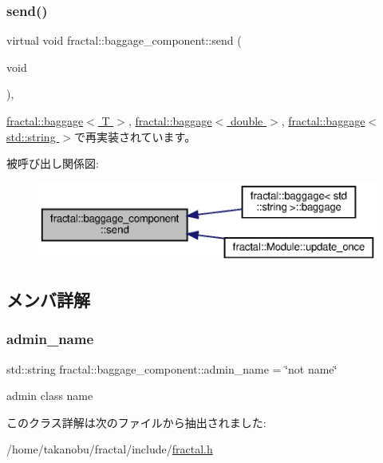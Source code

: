 \subsubsection{\texorpdfstring{send()}{send()}}
{\footnotesize\ttfamily virtual void fractal\+::baggage\+\_\+component\+::send (\begin{DoxyParamCaption}\item[{void}]{ }\end{DoxyParamCaption})\hspace{0.3cm}{\ttfamily [inline]}, {\ttfamily [virtual]}}



\hyperlink{classfractal_1_1baggage_a12ef96c1b906369cfeeabdead61c257b}{fractal\+::baggage$<$ T $>$}, \hyperlink{classfractal_1_1baggage_a12ef96c1b906369cfeeabdead61c257b}{fractal\+::baggage$<$ double $>$}, \hyperlink{classfractal_1_1baggage_a12ef96c1b906369cfeeabdead61c257b}{fractal\+::baggage$<$ std\+::string $>$}で再実装されています。

被呼び出し関係図\+:
\nopagebreak
\begin{figure}[H]
\begin{center}
\leavevmode
\includegraphics[width=350pt]{classfractal_1_1baggage__component_a8fdf9e534f892911e674de5a60eadf64_icgraph}
\end{center}
\end{figure}


\subsection{メンバ詳解}
\mbox{\label{classfractal_1_1baggage__component_a629dba0fbfbce31e2caeb075440ee2dc}} 
\subsubsection{\texorpdfstring{admin\+\_\+name}{admin\_name}}
{\footnotesize\ttfamily std\+::string fractal\+::baggage\+\_\+component\+::admin\+\_\+name = \char`\"{}not name\char`\"{}}



admin class name 



このクラス詳解は次のファイルから抽出されました\+:\begin{DoxyCompactItemize}
\item 
/home/takanobu/fractal/include/\hyperlink{fractal_8h}{fractal.\+h}\end{DoxyCompactItemize}
